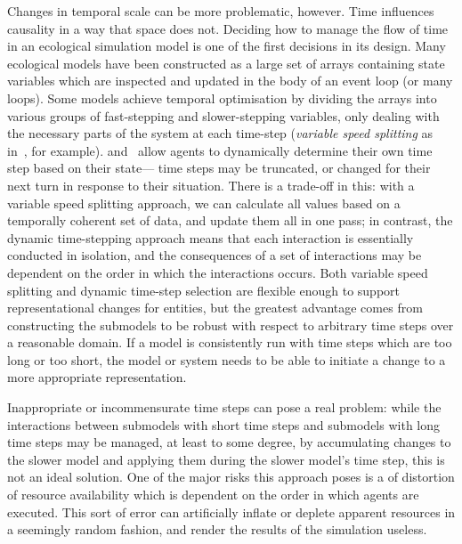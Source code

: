 Changes in temporal scale can be more problematic, however. Time
influences causality in a way that space does not. Deciding how to
manage the flow of time in an ecological simulation model is one of
the first decisions in its design.  Many ecological models have been
constructed as a large set of arrays containing state variables which
are inspected and updated in the body of an event loop (or many
loops). Some models achieve temporal optimisation by dividing the
arrays into various groups of fast-stepping and slower-stepping
variables, only dealing with the necessary parts of the system at each
time-step (\emph{variable speed splitting\/} as
in~\cite{walters2000ecosystem}, for example). \Cite{Gray06:1}
and~\cite{Gray2014} allow agents to dynamically determine their own
time step based on their state--- time steps may be truncated, or
changed for their next turn in response to their situation. There is a
trade-off in this: with a variable speed splitting approach, we can
calculate all values based on a temporally coherent set of data, and
update them all in one pass; in contrast, the dynamic time-stepping
approach means that each interaction is essentially conducted in
isolation, and the consequences of a set of interactions may be
dependent on the order in which the interactions occurs. Both variable
speed splitting and dynamic time-step selection are flexible enough to
support representational changes for entities, but the greatest
advantage comes from constructing the submodels to be robust with
respect to arbitrary time steps over a reasonable domain.  If a model
is consistently run with time steps which are too long or too short,
the model or system needs to be able to initiate a change to a more
appropriate representation.

Inappropriate or incommensurate time steps can pose a real problem:
while the interactions between submodels with short time steps and
submodels with long time steps may be managed, at least to some degree,
by accumulating changes to the slower model and applying them during
the slower model's time step,  this is not an ideal solution. One of
the major risks this approach poses is a of distortion of resource
availability which is dependent on the order in which agents are
executed. This sort of error can artificially inflate or deplete
apparent resources in a seemingly random fashion, and render the
results of the simulation useless.



